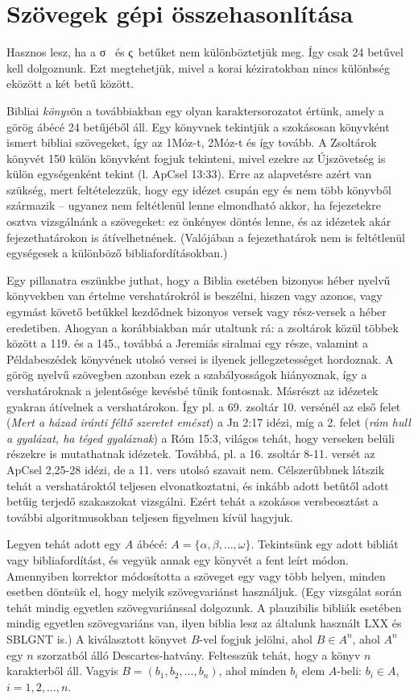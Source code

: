 \documentclass{article}
\newcommand\gr{\selectlanguage{greek}\frenchspacing}
\newcommand\hu{\selectlanguage{magyar}\frenchspacing}
\begin{document}
\section{Szövegek gépi összehasonlítása}

Hasznos lesz, ha a \gr σ  \hu\ és \gr ς\hu\ betűket nem különböztetjük meg. Így csak 24 betűvel kell dolgoznunk.
Ezt megtehetjük, mivel a korai kéziratokban nincs különbség eközött a két betű között.

Bibliai \textit{könyv}ön a továbbiakban egy olyan karaktersorozatot értünk, amely a görög ábécé 24
betűjéből áll. Egy könyvnek tekintjük a szokásosan könyvként ismert bibliai szövegeket,
így az 1Móz-t, 2Móz-t és így tovább. A Zsoltárok könyvét 150 külön könyvként fogjuk tekinteni,
mivel ezekre az Újszövetség is külön egységenként tekint (l. ApCsel 13:33).
Erre az alapvetésre azért van szükség, mert feltételezzük, hogy egy idézet csupán egy és nem több
könyvből származik -- ugyanez nem feltétlenül lenne elmondható akkor, ha fejezetekre osztva
vizsgálnánk a szövegeket: ez önkényes döntés lenne, és az idézetek akár fejezethatárokon is átívelhetnének.
(Valójában a fejezethatárok nem is feltétlenül egységesek a különböző bibliafordításokban.)

Egy pillanatra eszünkbe juthat, hogy a Biblia esetében bizonyos héber nyelvű könyvekben van értelme vershatárokról is
beszélni, hiszen vagy azonos, vagy egymást követő betűkkel kezdődnek bizonyos versek vagy rész-versek a héber
eredetiben. Ahogyan a korábbiakban már utaltunk rá: a zsoltárok közül többek között a 119. és a 145.,
továbbá a Jeremiás siralmai egy része, valamint a Példabeszédek könyvének utolsó versei is ilyenek jellegzetességet
hordoznak.
A görög nyelvű szövegben azonban ezek a szabályosságok hiányoznak, így a vershatároknak
a jelentősége kevésbé tűnik fontosnak. Másrészt az idézetek gyakran átívelnek a vershatárokon.
Így pl. a 69. zsoltár 10. versénél az első felet (\textit{Mert a házad
iránti féltő szeretet emészt}) a Jn 2:17 idézi, míg a 2. felet (\textit{rám hull a gyalázat, ha téged gyaláznak})
a Róm 15:3, világos tehát, hogy verseken belüli részekre is mutathatnak idézetek. Továbbá, pl. a 16. zsoltár
8-11. versét az ApCsel 2,25-28 idézi, de a 11. vers utolsó szavait nem. Célszerűbbnek látszik tehát
a vershatároktól teljesen elvonatkoztatni, és inkább adott betűtől adott betűig terjedő szakaszokat vizsgálni.
Ezért tehát a szokásos versbeosztást a további algoritmusokban teljesen figyelmen kívül hagyjuk.

Legyen tehát adott egy $A$ ábécé: $A=\{\alpha,\beta,\ldots,\omega\}$. Tekintsünk egy adott bibliát
vagy bibliafordítást, és vegyük annak egy könyvét a fent leírt módon. Amennyiben korrektor módosította
a szöveget egy vagy több helyen, minden esetben döntsük el, hogy melyik szövegvariánst használjuk.
(Egy vizsgálat során tehát mindig egyetlen szövegvariánssal dolgozunk. A plauzibilis bibliák esetében
mindig egyetlen szövegvariáns van, ilyen biblia lesz az általunk használt LXX és SBLGNT is.)
A kiválasztott könyvet $B$-vel fogjuk jelölni,
ahol $B\in A^n$, ahol $A^n$ egy $n$ szorzatból álló Descartes-hatvány. Feltesszük tehát, hogy a könyv
$n$ karakterből áll. Vagyis $B=(b_1,b_2,\ldots,b_n)$, ahol minden $b_i$ elem $A$-beli:
$b_i\in A$, $i=1,2,\ldots,n$.
\end{document}
